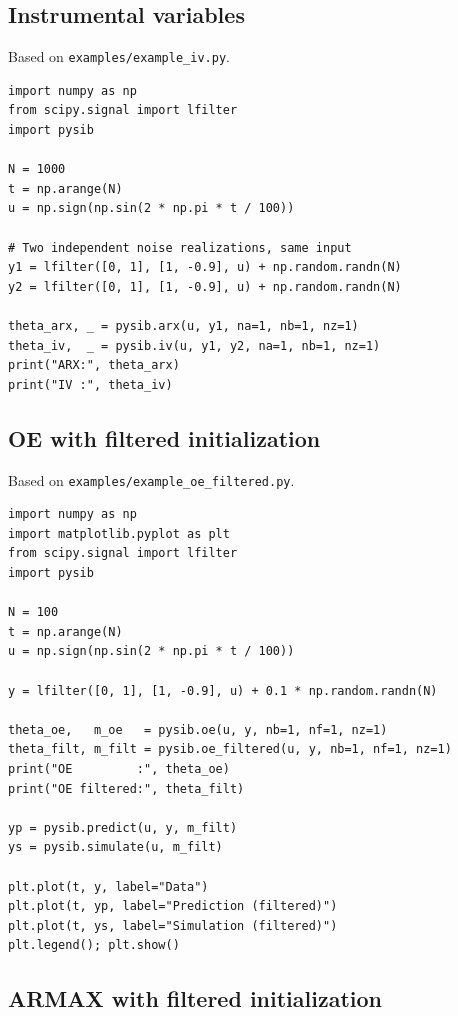 \documentclass[11pt,a4paper]{article}
\begin{document}
\subsection{Instrumental variables}

Based on \texttt{examples/example\_iv.py}.

\begin{lstlisting}
import numpy as np
from scipy.signal import lfilter
import pysib

N = 1000
t = np.arange(N)
u = np.sign(np.sin(2 * np.pi * t / 100))

# Two independent noise realizations, same input
y1 = lfilter([0, 1], [1, -0.9], u) + np.random.randn(N)
y2 = lfilter([0, 1], [1, -0.9], u) + np.random.randn(N)

theta_arx, _ = pysib.arx(u, y1, na=1, nb=1, nz=1)
theta_iv,  _ = pysib.iv(u, y1, y2, na=1, nb=1, nz=1)
print("ARX:", theta_arx)
print("IV :", theta_iv)
\end{lstlisting}

\subsection{OE with filtered initialization}

Based on \texttt{examples/example\_oe\_filtered.py}.

\begin{lstlisting}
import numpy as np
import matplotlib.pyplot as plt
from scipy.signal import lfilter
import pysib

N = 100
t = np.arange(N)
u = np.sign(np.sin(2 * np.pi * t / 100))

y = lfilter([0, 1], [1, -0.9], u) + 0.1 * np.random.randn(N)

theta_oe,   m_oe   = pysib.oe(u, y, nb=1, nf=1, nz=1)
theta_filt, m_filt = pysib.oe_filtered(u, y, nb=1, nf=1, nz=1)
print("OE         :", theta_oe)
print("OE filtered:", theta_filt)

yp = pysib.predict(u, y, m_filt)
ys = pysib.simulate(u, m_filt)

plt.plot(t, y, label="Data")
plt.plot(t, yp, label="Prediction (filtered)")
plt.plot(t, ys, label="Simulation (filtered)")
plt.legend(); plt.show()
\end{lstlisting}

\subsection{ARMAX with filtered initialization}
\end{document}
